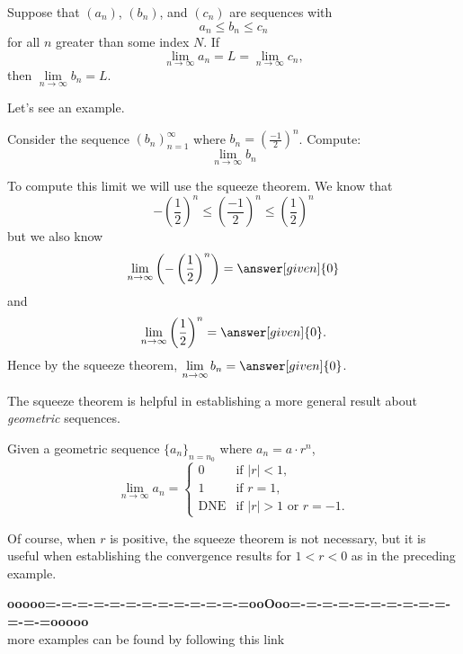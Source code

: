 \documentclass{ximera}
\begin{document}
\begin{theorem}
  Suppose that $(a_n)$, $(b_n)$, and $(c_n)$ are sequences with
  \[
  a_n \le b_n \le c_n
  \]
  for all $n$ greater than some index $N$. If
  \[
  \lim\limits_{n\to\infty} a_n = L = \lim\limits_{n\to\infty} c_n,
  \] 
  then $\lim\limits_{n\to\infty} b_n = L$.
\end{theorem}

Let's see an example.

\begin{example}
  Consider the sequence $(b_n)_{n=1}^{\infty}$ where $b_n =
  \left(\frac{-1}{2}\right)^n$. Compute:
  \[
  \lim\limits_{n\to\infty}b_n
  \]
  \begin{explanation}
    To compute this limit we will use the squeeze theorem. We know that
    \[
    -\left(\frac{1}{2}\right)^n\le \left(\frac{-1}{2}\right)^n \le \left(\frac{1}{2}\right)^n
    \]
    but we also know
    \[
    \lim\limits_{n\to \infty}\left(-\left(\frac{1}{2}\right)^n\right) = \answer[given]{0}
    \]
    and
    \[
    \lim\limits_{n\to \infty}\left(\frac{1}{2}\right)^n =\answer[given]{0}.
    \]
    Hence by the squeeze theorem, $\lim\limits_{n\to\infty} b_n = \answer[given]{0}$.
  \end{explanation}
\end{example}

%

The squeeze theorem is helpful in establishing a more general result about \emph{geometric} sequences.
\begin{theorem}
  Given a geometric sequence $\{a_n\}_{n=n_0}$ where $a_n = a \cdot r^{n}$,
  \[
  \lim\limits_{n\to\infty} a_n =
  \begin{cases}
    0 &\text{if $|r|<1$,}\\
    1 &\text{if $r=1$,}\\
    \text{DNE} &\text{if $|r|>1$ or $r=-1$.}
  \end{cases}
  \]
\end{theorem}
Of course, when $r$ is positive, the squeeze theorem is not necessary, but it is useful when establishing the convergence results for $1<r<0$ as in the preceding example.















\begin{center}
\textbf{\textcolor{green!50!black}{ooooo=-=-=-=-=-=-=-=-=-=-=-=-=ooOoo=-=-=-=-=-=-=-=-=-=-=-=-=ooooo}} \\

more examples can be found by following this link\\ 

\end{center}
\end{document}
